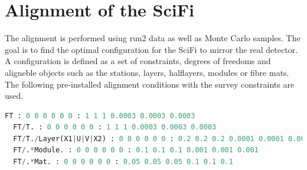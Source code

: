 \chapter{Alignment of the SciFi}
\label{sec:story}




The alignment is performed using run2 data as well as Monte Carlo samples.
The goal is to find the optimal configuration for the SciFi to mirror the real detector.
A configuration is defined as a set of constraints, degrees of freedoms and aligneble objects such as the stations, layers, halflayers, modules or fibre mats.
The following pre-installed alignment conditions with the survey constraints are used.\\

\begin{lstlisting}[language=Python]
  FT : 0 0 0 0 0 0 : 1 1 1 0.0003 0.0003 0.0003
  FT/T. : 0 0 0 0 0 0 : 1 1 1 0.0003 0.0003 0.0003
  FT/T./Layer(X1|U|V|X2) : 0 0 0 0 0 0 : 0.2 0.2 0.2 0.0001 0.0001 0.0001
  FT/.*Module. : 0 0 0 0 0 0 : 0.1 0.1 0.1 0.001 0.001 0.001
  FT/.*Mat. : 0 0 0 0 0 0 : 0.05 0.05 0.05 0.1 0.1 0.1
\end{lstlisting}

